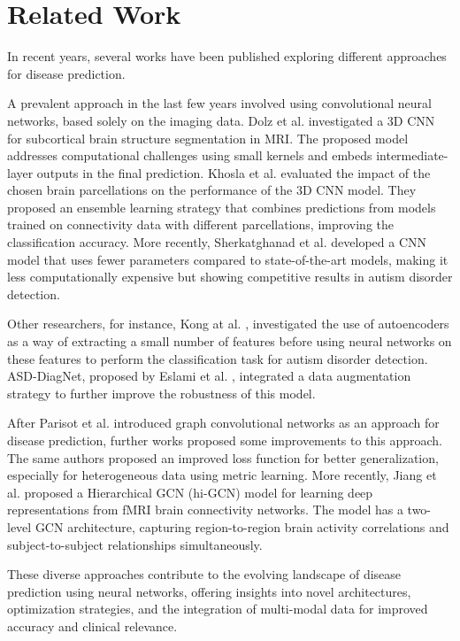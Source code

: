 \section{Related Work}

\quad In recent years, several works have been published exploring different approaches for disease prediction.

A prevalent approach in the last few years involved using convolutional neural networks, based solely on the imaging data. Dolz et al. \cite{Dolz2018} investigated a 3D CNN for subcortical brain structure segmentation in MRI. The proposed model addresses computational challenges using small kernels and embeds intermediate-layer outputs in the final prediction. Khosla et al. \cite{Khosla2019} evaluated the impact of the chosen brain parcellations on the performance of the 3D CNN model. They proposed an ensemble learning strategy that combines predictions from models trained on connectivity data with different parcellations, improving the classification accuracy. More recently, Sherkatghanad et al. \cite{Sherkatghanad2020} developed a CNN model that uses fewer parameters compared to state-of-the-art models, making it less computationally expensive but showing competitive results in autism disorder detection.

Other researchers, for instance, Kong at al. \cite{Kong2019}, investigated the use of autoencoders as a way of extracting a small number of features before using neural networks on these features to perform the classification task for autism disorder detection. ASD-DiagNet, proposed by Eslami et al. \cite{Eslami2019}, integrated a data augmentation strategy to further improve the robustness of this model.

After Parisot et al. \cite{Parisot17} introduced graph convolutional networks as an approach for disease prediction, further works proposed some improvements to this approach. The same authors proposed an improved loss function for better generalization, especially for heterogeneous data using metric learning. More recently, Jiang et al. \cite{Jiang2020} proposed a Hierarchical GCN (hi-GCN) model for learning deep representations from fMRI brain connectivity networks. The model has a two-level GCN architecture, capturing region-to-region brain activity correlations and subject-to-subject relationships simultaneously.

These diverse approaches contribute to the evolving landscape of disease prediction using neural networks, offering insights into novel architectures, optimization strategies, and the integration of multi-modal data for improved accuracy and clinical relevance.